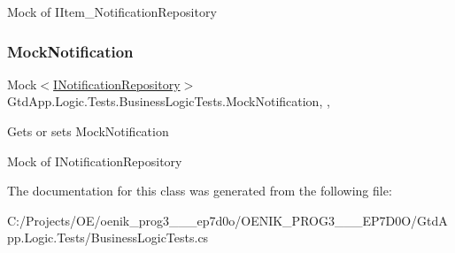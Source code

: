 Mock of I\+Item\+\_\+\+Notification\+Repository\mbox{\label{class_gtd_app_1_1_logic_1_1_tests_1_1_business_logic_tests_a2bb9b185d9d68fda239c1ce46ffee766}} 
\subsubsection{\texorpdfstring{Mock\+Notification}{MockNotification}}
{\footnotesize\ttfamily Mock$<$\mbox{\hyperlink{interface_gtd_app_1_1_repository_1_1_interfaces_1_1_i_notification_repository}{I\+Notification\+Repository}}$>$ Gtd\+App.\+Logic.\+Tests.\+Business\+Logic\+Tests.\+Mock\+Notification\hspace{0.3cm}{\ttfamily [get]}, {\ttfamily [set]}, {\ttfamily [protected]}}



Gets or sets Mock\+Notification 

Mock of I\+Notification\+Repository

The documentation for this class was generated from the following file\+:\begin{DoxyCompactItemize}
\item 
C\+:/\+Projects/\+O\+E/oenik\+\_\+prog3\+\_\+\_\+\_\+ep7d0o/\+O\+E\+N\+I\+K\+\_\+\+P\+R\+O\+G3\+\_\+\_\+\_\+\+E\+P7\+D0\+O/\+Gtd\+App.\+Logic.\+Tests/Business\+Logic\+Tests.\+cs\end{DoxyCompactItemize}
